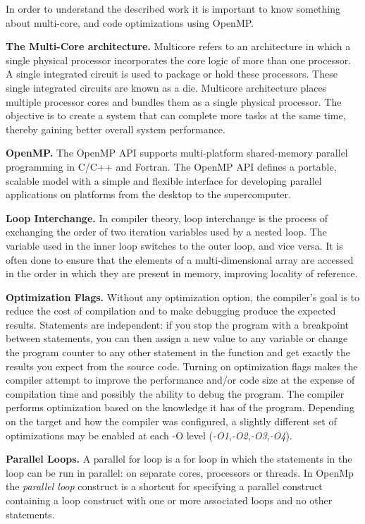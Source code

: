 \documentclass[conference]{IEEEtran}
\newcommand{\mypar}[1]{{\bf #1.}}
\begin{document}
In order to understand the described work it is important to know something about multi-core, and code optimizations using OpenMP.

\mypar{The Multi-Core architecture}
Multicore refers to an architecture in which a single physical processor incorporates the core logic of more than one processor. A single integrated circuit is used to package or hold these processors. These single integrated circuits are known as a die. Multicore architecture places multiple processor cores and bundles them as a single physical processor. The objective is to create a system that can complete more tasks at the same time, thereby gaining better overall system performance. \cite{techopedia}

\mypar{OpenMP}
The OpenMP API supports multi-platform shared-memory parallel programming in C/C++ and Fortran. The OpenMP API defines a portable, scalable model with a simple and flexible interface for developing parallel applications on platforms from the desktop to the supercomputer. \cite{openmp}

\mypar{Loop Interchange}
In compiler theory, loop interchange is the process of exchanging the order of two iteration variables used by a nested loop. The variable used in the inner loop switches to the outer loop, and vice versa. It is often done to ensure that the elements of a multi-dimensional array are accessed in the order in which they are present in memory, improving locality of reference. \cite{loop-interchange}

\mypar{Optimization Flags}
Without any optimization option, the compiler's goal is to reduce the cost of compilation and to make debugging produce the expected results. Statements are independent: if you stop the program with a breakpoint between statements, you can then assign a new value to any variable or change the program counter to any other statement in the function and get exactly the results you expect from the source code. 
Turning on optimization flags makes the compiler attempt to improve the performance and/or code size at the expense of compilation time and possibly the ability to debug the program. 
The compiler performs optimization based on the knowledge it has of the program. 
Depending on the target and how the compiler was configured, a slightly different set of optimizations may be enabled at each -O level (\textit{-O1},\textit{-O2},\textit{-O3},\textit{-O4}).\cite{optimization-flags}

\mypar{Parallel Loops}
A parallel for loop is a for loop in which the statements in the loop can be run in parallel: on separate cores, processors or threads. 
In OpenMp the \textit{parallel loop} construct is a shortcut for specifying a parallel construct containing a loop construct with one or more associated loops and no other statements. \cite{parallel-loops}
\end{document}
